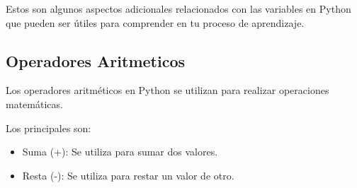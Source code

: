 Estos son algunos aspectos adicionales relacionados con las variables en Python que pueden ser útiles para comprender en tu proceso de aprendizaje.

\subsection{Operadores Aritmeticos}
Los operadores aritméticos en Python se utilizan para realizar operaciones matemáticas. 

Los principales son:
\begin{itemize}
    \item Suma (+): Se utiliza para sumar dos valores.
    \begin{figure}[h]
      \centering
    \end{figure}

    \item Resta (-): Se utiliza para restar un valor de otro.
    \begin{figure}[h]
      \centering
    \end{figure}


\end{itemize}
